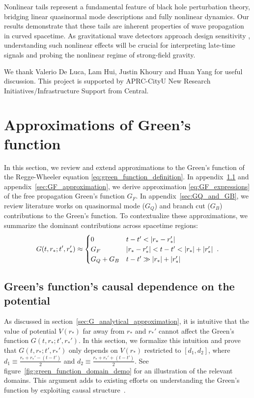 \documentclass[reprint,aps,physrev,superscriptaddress,10pt,notitlepage,prd,nofootinbib,onecolumn]{revtex4-2}
\newcommand{\fref}[1]{figure~\ref{#1}}
\newcommand{\sref}[1]{section~\ref{#1}}
\newcommand{\aref}[1]{appendix~\ref{#1}}
\begin{document}
Nonlinear tails represent a fundamental feature of black hole perturbation theory, bridging linear quasinormal mode descriptions and fully nonlinear dynamics.
Our results demonstrate that these tails are inherent properties of wave propagation in curved spacetime.
As gravitational wave detectors approach design sensitivity \cite{LIGOScientific:2018mvr,LIGOScientific:2020ibl,KAGRA:2021vkt}, understanding such nonlinear effects will be crucial for interpreting late-time signals and probing the nonlinear regime of strong-field gravity.



\acknowledgments

We thank Valerio De Luca, Lam Hui, Justin Khoury and Huan Yang for useful discussion. This project is supported by APRC-CityU New Research Initiatives/Infrastructure Support from Central.



\appendix
\section{Approximations of Green's function}
\label{sec:review_of_green_function}

In this section, we review and extend approximations to the Green's function of the Regge-Wheeler equation \eqref{eq:green_function_definition}.
In \aref{sec:causality_arguments} and \aref{sec:GF_approximation}, we derive approximation \eqref{eq:GF_expressions} of the free propagation Green's function $G_F$.
In \aref{sec:GQ_and_GB}, we review literature works on quasinormal mode ($G_Q$) and branch cut ($G_B$) contributions to the Green's function.
To contextualize these approximations, we summarize the dominant contributions across spacetime regions:
\begin{align}
  G(t,r_*;t',r_*') \approx
  \begin{cases}
    0 & t-t' < \abs{r_* - r_*'} \\
    G_F & \abs{r_* - r_*'} < t-t' < \abs{r_*} + \abs{r_*'} \\
    G_Q + G_B & t-t' \gg \abs{r_*} + \abs{r_*'}
  \end{cases}
  \;.
\end{align}



\subsection{Green's function's causal dependence on the potential}
\label{sec:causality_arguments}
As discussed in \sref{sec:G_analytical_approximation}, it is intuitive that the value of potential $V(r_*)$ far away from $r_*$ and $r_*'$ cannot affect the Green's function $G(t,r_*;t',r_*')$.
In this section, we formalize this intuition and prove that $G(t,r_*;t',r_*')$ only depends on $V(r_*)$ restricted to $[d_1,d_2]$, where $d_1 \equiv \frac{r_*+r_*' - (t-t')}{2}$ and $d_2 \equiv \frac{r_*+r_*' + (t-t')}{2}$.
See \fref{fig:green_function_domain_demo} for an illustration of the relevant domains.
This argument adds to existing efforts on understanding the Green's function by exploiting causal structure~\cite{Hui:2019aox,Lagos:2022otp}.
\end{document}

